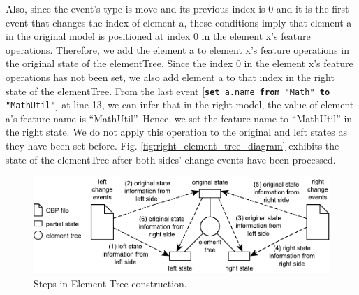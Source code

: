\documentclass{jot}
\begin{document}
    Also, since the event's type is \textsf{move} and its previous index is 0 and it is the first event that changes the index of element \textsf{a}, these conditions imply that element \textsf{a} in the original model is positioned at index 0 in the element \textsf{x}'s feature \textsf{operations}. Therefore, we add the element \textsf{a} to element \textsf{x}'s feature \textsf{operations} in the original state of the \textsf{elementTree}. Since the index 0 in the element \textsf{x}'s feature \textsf{operations} has not been set, we also add element \textsf{a} to that index in the right state of the \textsf{elementTree}. From the last event [\texttt{\small \textbf{set} a.name \textbf{from} "Math" \textbf{to} "MathUtil"}] at line 13, we can infer that in the right model, the value of element \textsf{a}'s feature \textsf{name} is ``MathUtil''. Hence, we set the feature \textsf{name} to ``MathUtil'' in the right state. 
    We do not apply this operation to the original and left states as they have been set before.
    Fig. \ref{fig:right_element_tree_diagram} exhibits the state of the \textsf{elementTree} after both sides' change events have been processed.
    
    \begin{figure}
        \centering
        \includegraphics[width=0.7\linewidth]{TreeConstruction}
        \caption{Steps in Element Tree construction.}
        \label{fig:tree_construction}
    \end{figure} 
    
\end{document}
